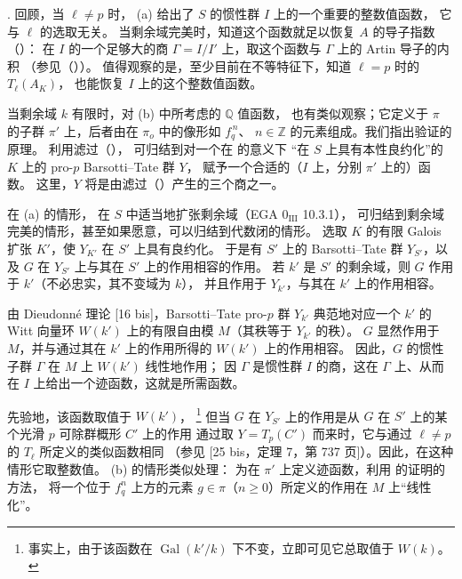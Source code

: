 \medskip
\noindent
{}. 回顾，当 $\ell\neq p$ 时，
(a) 给出了 $S$ 的惯性群 $I$ 上的一个重要的整数值函数，
它与 $\ell$ 的选取无关。
当剩余域完美时，知道这个函数就足以恢复 $A$ 的导子指数
（）：
在 $I$ 的一个足够大的商 $\Gamma=I/I'$ 上，取这个函数与 $\Gamma$ 上的 Artin 导子的内积
（参见（））。
值得观察的是，至少目前在不等特征下，知道 $\ell=p$ 时的 $T_\ell(A_K)$，
也能恢复 $I$ 上的这个整数值函数。

当剩余域 $k$ 有限时，对 (b) 中所考虑的 $\mathbb Q$ 值函数，
也有类似观察；它定义于 $\pi$ 的子群 $\pi'$ 上，后者由在 $\pi_o$ 中的像形如 $f_q^{\,n}$、
$n\in\mathbb Z$ 的元素组成。我们指出验证的原理。
利用滤过（），
可归结到对一个在  的意义下
“在 $S$ 上具有本性良约化”的 $K$ 上的 pro-$p$ Barsotti--Tate 群 $Y$，
赋予一个合适的（$I$ 上，分别 $\pi'$ 上的）函数。
这里，$Y$ 将是由滤过（）产生的三个商之一。

在 (a) 的情形，
在 $S$ 中适当地扩张剩余域（EGA $0_{\mathrm{III}}$ 10.3.1），
可归结到剩余域完美的情形，甚至如果愿意，可以归结到代数闭的情形。
选取 $K$ 的有限 Galois 扩张 $K'$，使 $Y_{K'}$ 在 $S'$ 上具有良约化。
于是有 $S'$ 上的 Barsotti--Tate 群 $Y_{S'}$，以及 $G$ 在 $Y_{S'}$ 上与其在 $S'$ 上的作用相容的作用。
若 $k'$ 是 $S'$ 的剩余域，则 $G$ 作用于 $k'$（不必忠实，其不变域为 $k$），
并且作用于 $Y_{k'}$，与其在 $k'$ 上的作用相容。

由 Dieudonn\'e 理论 [16 bis]，Barsotti--Tate pro-$p$ 群 $Y_{k'}$ 典范地对应一个
$k'$ 的 Witt 向量环 $W(k')$ 上的有限自由模 $M$（其秩等于 $Y_{k'}$ 的秩）。
$G$ 显然作用于 $M$，并与通过其在 $k'$ 上的作用所得的 $W(k')$ 上的作用相容。
因此，$G$ 的惯性子群 $\Gamma$ 在 $M$ 上 $W(k')$ 线性地作用；
因 $\Gamma$ 是惯性群 $I$ 的商，这在 $\Gamma$ 上、从而在 $I$ 上给出一个迹函数，这就是所需函数。

先验地，该函数取值于 $W(k')$，
\footnote{事实上，由于该函数在 $\operatorname{Gal}(k'/k)$ 下不变，立即可见它总取值于 $W(k)$。}
但当 $G$ 在 $Y_{S'}$ 上的作用是从 $G$ 在 $S'$ 上的某个光滑 $p$ 可除群概形 $C'$ 上的作用
通过取 $Y=T_p(C')$ 而来时，它与通过 $\ell\neq p$ 的 $T_\ell$ 所定义的类似函数相同
（参见 [25 bis，定理 7，第 737 页]）。因此，在这种情形它取整数值。
(b) 的情形类似处理：
为在 $\pi'$ 上定义迹函数，利用  的证明的方法，
将一个位于 $f_q^n$ 上方的元素 $g\in\pi$（$n\geq0$）所定义的作用在 $M$ 上“线性化”。

